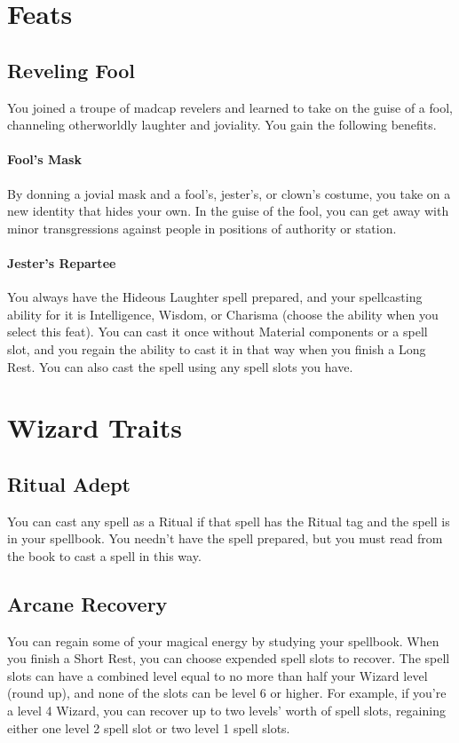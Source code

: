 \documentclass[letterpaper,openany,oneside,twocolumn]{book}
\begin{document}
\section*{Feats}
\subsection*{Reveling Fool}
You joined a troupe of madcap revelers and learned to take on the guise of a fool, channeling otherworldly laughter and joviality. You gain the following benefits.

\paragraph*{Fool's Mask} By donning a jovial mask and a fool's, jester's, or clown's costume, you take on a new identity that hides your own. In the guise of the fool, you can get away with minor transgressions against people in positions of authority or station.

\paragraph*{Jester's Repartee} You always have the Hideous Laughter spell prepared, and your spellcasting ability for it is Intelligence, Wisdom, or Charisma (choose the ability when you select this feat). You can cast it once without Material components or a spell slot, and you regain the ability to cast it in that way when you finish a Long Rest. You can also cast the spell using any spell slots you have.

\section*{Wizard Traits}
\subsection*{Ritual Adept}
You can cast any spell as a Ritual if that spell has the Ritual tag and the spell is in your spellbook. You needn't have the spell prepared, but you must read from the book to cast a spell in this way.
\subsection*{Arcane Recovery}
You can regain some of your magical energy by studying your spellbook. When you finish a Short Rest, you can choose expended spell slots to recover. The spell slots can have a combined level equal to no more than half your Wizard level (round up), and none of the slots can be level 6 or higher. For example, if you're a level 4 Wizard, you can recover up to two levels' worth of spell slots, regaining either one level 2 spell slot or two level 1 spell slots.
\end{document}
